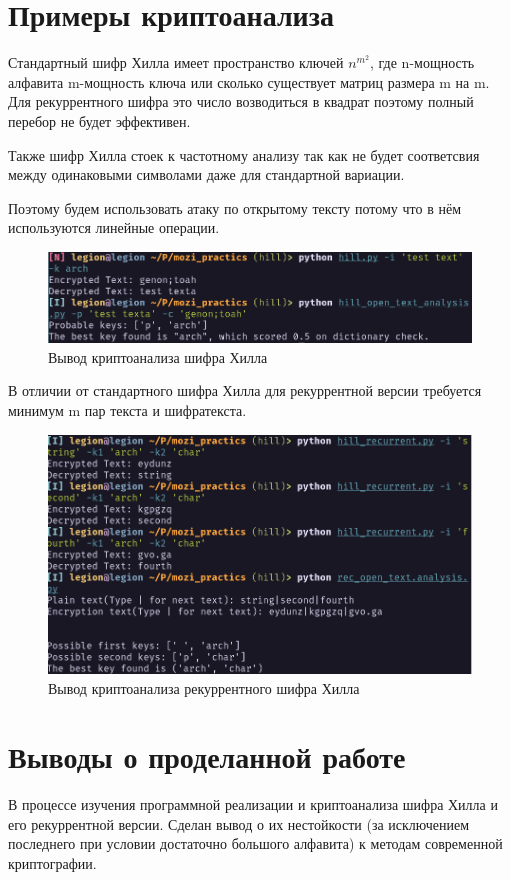 \documentclass[a4paper]{article}
\begin{document}
\section{Примеры криптоанализа}

Стандартный шифр Хилла имеет пространство ключей $n^{m^2}$, где n-мощность алфавита m-мощность ключа или сколько существует матриц размера m на m. Для рекуррентного шифра это число возводиться в квадрат поэтому полный перебор не будет эффективен. 

Также шифр Хилла стоек к частотному анализу так как не будет соответсвия между одинаковыми символами даже для стандартной вариации. 

Поэтому будем использовать атаку по открытому тексту потому что в нём используются линейные операции.

\begin{figure}[h]
    \centering
    \includegraphics[width=\textwidth]{hill_3.png}
    \caption{Вывод криптоанализа шифра Хилла}
\end{figure}


В отличии от стандартного шифра Хилла для рекуррентной версии требуется минимум m пар текста и шифратекста. 

\begin{figure}[h]
    \centering
    \includegraphics[width=\textwidth]{hill_4.png}
    \caption{Вывод криптоанализа рекуррентного шифра Хилла}
\end{figure}

\section{Выводы о проделанной работе}
В процессе изучения программной реализации и криптоанализа шифра Хилла и его рекуррентной версии. Сделан вывод о их нестойкости (за исключением последнего при условии достаточно большого алфавита) к методам современной криптографии.
\end{document}
